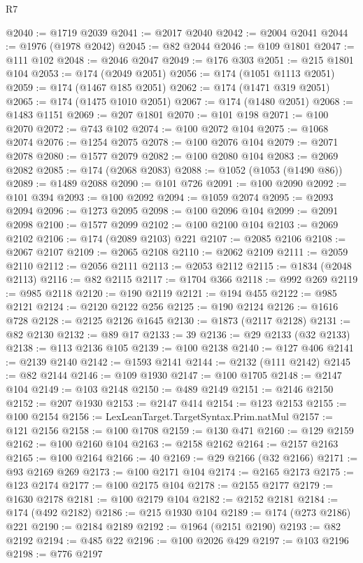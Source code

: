 \begin{lexlean}{R7}
\begin{coremodule}
@2040 := @1719 @2039
@2041 := @2017 @2040
@2042 := @2004 @2041
@2044 := @1976 (@1978 @2042)
@2045 := @82 @2044
@2046 := @109 @1801
@2047 := @111 @102
@2048 := @2046 @2047
@2049 := @176 @303
@2051 := @215 @1801 @104
@2053 := @174 (@2049 @2051)
@2056 := @174 (@1051 @1113 @2051)
@2059 := @174 (@1467 @185 @2051)
@2062 := @174 (@1471 @319 @2051)
@2065 := @174 (@1475 @1010 @2051)
@2067 := @174 (@1480 @2051)
@2068 := @1483 @1151
@2069 := @207 @1801
@2070 := @101 @198
@2071 := @100 @2070
@2072 := @743 @102
@2074 := @100 @2072 @104
@2075 := @1068 @2074
@2076 := @1254 @2075
@2078 := @100 @2076 @104
@2079 := @2071 @2078
@2080 := @1577 @2079
@2082 := @100 @2080 @104
@2083 := @2069 @2082
@2085 := @174 (@2068 @2083)
@2088 := @1052 (@1053 (@1490 @86))
@2089 := @1489 @2088
@2090 := @101 @726
@2091 := @100 @2090
@2092 := @101 @394
@2093 := @100 @2092
@2094 := @1059 @2074
@2095 := @2093 @2094
@2096 := @1273 @2095
@2098 := @100 @2096 @104
@2099 := @2091 @2098
@2100 := @1577 @2099
@2102 := @100 @2100 @104
@2103 := @2069 @2102
@2106 := @174 (@2089 @2103) @221
@2107 := @2085 @2106
@2108 := @2067 @2107
@2109 := @2065 @2108
@2110 := @2062 @2109
@2111 := @2059 @2110
@2112 := @2056 @2111
@2113 := @2053 @2112
@2115 := @1834 (@2048 @2113)
@2116 := @82 @2115
@2117 := @1704 @366
@2118 := @992 @269
@2119 := @985 @2118
@2120 := @190 @2119
@2121 := @194 @455
@2122 := @985 @2121
@2124 := @2120 @2122 @256
@2125 := @190 @2124
@2126 := @1616 @728
@2128 := @2125 @2126 @1645
@2130 := @1873 (@2117 @2128)
@2131 := @82 @2130
@2132 := @89 @17
@2133 := 39
@2136 := @29 @2133 (@32 @2133)
@2138 := @113 @2136 @105
@2139 := @100 @2138
@2140 := @127 @406
@2141 := @2139 @2140
@2142 := @1593 @2141
@2144 := @2132 (@111 @2142)
@2145 := @82 @2144
@2146 := @109 @1930
@2147 := @100 @1705
@2148 := @2147 @104
@2149 := @103 @2148
@2150 := @489 @2149
@2151 := @2146 @2150
@2152 := @207 @1930
@2153 := @2147 @414
@2154 := @123 @2153
@2155 := @100 @2154
@2156 := LexLeanTarget.TargetSyntax.Prim.natMul
@2157 := @121 @2156
@2158 := @100 @1708
@2159 := @130 @471
@2160 := @129 @2159
@2162 := @100 @2160 @104
@2163 := @2158 @2162
@2164 := @2157 @2163
@2165 := @100 @2164
@2166 := 40
@2169 := @29 @2166 (@32 @2166)
@2171 := @93 @2169 @269
@2173 := @100 @2171 @104
@2174 := @2165 @2173
@2175 := @123 @2174
@2177 := @100 @2175 @104
@2178 := @2155 @2177
@2179 := @1630 @2178
@2181 := @100 @2179 @104
@2182 := @2152 @2181
@2184 := @174 (@492 @2182)
@2186 := @215 @1930 @104
@2189 := @174 (@273 @2186) @221
@2190 := @2184 @2189
@2192 := @1964 (@2151 @2190)
@2193 := @82 @2192
@2194 := @485 @22
@2196 := @100 @2026 @429
@2197 := @103 @2196
@2198 := @776 @2197

\end{coremodule}
\end{lexlean}
